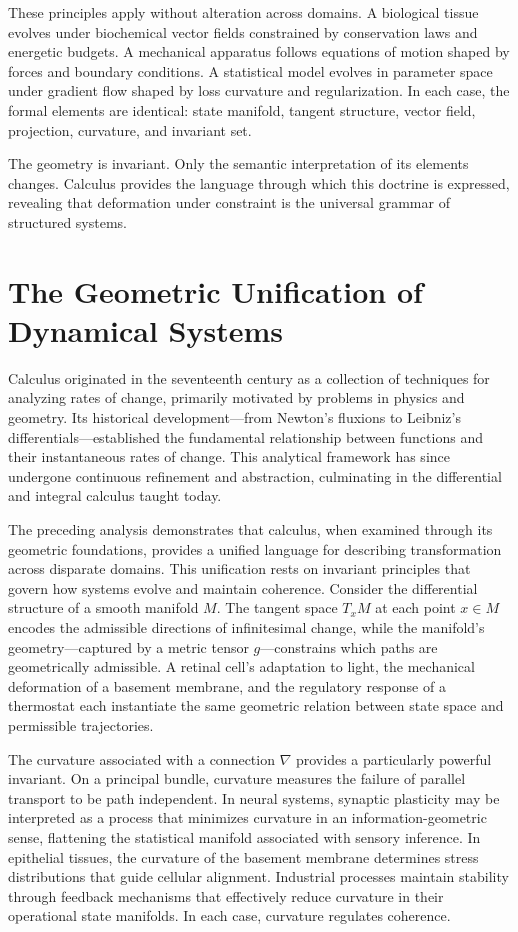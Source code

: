 \documentclass[12pt]{book}
\begin{document}
These principles apply without alteration across domains. A biological tissue evolves under biochemical vector fields constrained by conservation laws and energetic budgets. A mechanical apparatus follows equations of motion shaped by forces and boundary conditions. A statistical model evolves in parameter space under gradient flow shaped by loss curvature and regularization. In each case, the formal elements are identical: state manifold, tangent structure, vector field, projection, curvature, and invariant set.

The geometry is invariant. Only the semantic interpretation of its elements changes. Calculus provides the language through which this doctrine is expressed, revealing that deformation under constraint is the universal grammar of structured systems.

\section{The Geometric Unification of Dynamical Systems}

Calculus originated in the seventeenth century as a collection of techniques for analyzing rates of change, primarily motivated by problems in physics and geometry. Its historical development---from Newton's fluxions to Leibniz's differentials---established the fundamental relationship between functions and their instantaneous rates of change. This analytical framework has since undergone continuous refinement and abstraction, culminating in the differential and integral calculus taught today.

The preceding analysis demonstrates that calculus, when examined through its geometric foundations, provides a unified language for describing transformation across disparate domains. This unification rests on invariant principles that govern how systems evolve and maintain coherence. Consider the differential structure of a smooth manifold $M$. The tangent space $T_x M$ at each point $x \in M$ encodes the admissible directions of infinitesimal change, while the manifold's geometry---captured by a metric tensor $g$---constrains which paths are geometrically admissible. A retinal cell's adaptation to light, the mechanical deformation of a basement membrane, and the regulatory response of a thermostat each instantiate the same geometric relation between state space and permissible trajectories.

The curvature associated with a connection $\nabla$ provides a particularly powerful invariant. On a principal bundle, curvature measures the failure of parallel transport to be path independent. In neural systems, synaptic plasticity may be interpreted as a process that minimizes curvature in an information-geometric sense, flattening the statistical manifold associated with sensory inference. In epithelial tissues, the curvature of the basement membrane determines stress distributions that guide cellular alignment. Industrial processes maintain stability through feedback mechanisms that effectively reduce curvature in their operational state manifolds. In each case, curvature regulates coherence.
\end{document}
